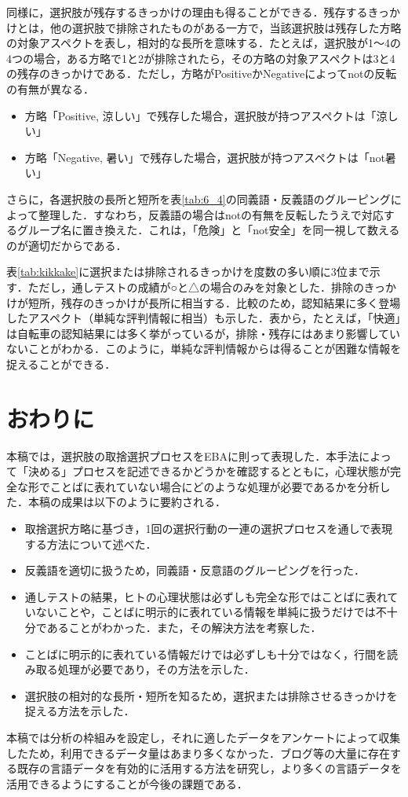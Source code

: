 \documentclass[japanese]{jnlp_1.3a}
\begin{document}
同様に，選択肢が残存するきっかけの理由も得ることができる．残存するきっかけとは，他の選択肢で排除されたものがある一方で，当該選択肢は残存した方略の対象アスペクトを表し，相対的な長所を意味する．たとえば，選択肢が1〜4の4つの場合，ある方略で1と2が排除されたら，その方略の対象アスペクトは3と4の残存のきっかけである．ただし，方略がPositiveかNegativeによってnotの反転の有無が異なる．
\begin{itemize}
\item 方略「Positive, 涼しい」で残存した場合，選択肢が持つアスペクトは「涼しい」
\item 方略「Negative, 暑い」で残存した場合，選択肢が持つアスペクトは「not暑い」
\end{itemize}

さらに，各選択肢の長所と短所を表\ref{tab:6_4}の同義語・反義語のグルーピングによって整理した．すなわち，反義語の場合はnotの有無を反転したうえで対応するグループ名に置き換えた．これは，「危険」と「not安全」を同一視して数えるのが適切だからである．

表\ref{tab:kikkake}に選択または排除されるきっかけを度数の多い順に3位まで示す．ただし，通しテストの成績が○と△の場合のみを対象とした．排除のきっかけが短所，残存のきっかけが長所に相当する．比較のため，認知結果に多く登場したアスペクト（単純な評判情報に相当）も示した．表から，たとえば，「快適」は自転車の認知結果には多く挙がっているが，排除・残存にはあまり影響していないことがわかる．このように，単純な評判情報からは得ることが困難な情報を捉えることができる．

\section{おわりに}
\label{sec:owarini}

本稿では，選択肢の取捨選択プロセスをEBAに則って表現した．本手法によって「決める」プロセスを記述できるかどうかを確認するとともに，心理状態が完全な形でことばに表れていない場合にどのような処理が必要であるかを分析した．本稿の成果は以下のように要約される．
\begin{itemize}
\item 取捨選択方略に基づき，1回の選択行動の一連の選択プロセスを通しで表現する方法について述べた．
\item 反義語を適切に扱うため，同義語・反意語のグルーピングを行った．
\item 通しテストの結果，ヒトの心理状態は必ずしも完全な形ではことばに表れていないことや，ことばに明示的に表れている情報を単純に扱うだけでは不十分であることがわかった．また，その解決方法を考察した．
\item ことばに明示的に表れている情報だけでは必ずしも十分ではなく，行間を読み取る処理が必要であり，その方法を示した．
\item 選択肢の相対的な長所・短所を知るため，選択または排除させるきっかけを捉える方法を示した．
\end{itemize}
本稿では分析の枠組みを設定し，それに適したデータをアンケートによって収集したため，利用できるデータ量はあまり多くなかった．ブログ等の大量に存在する既存の言語データを有効的に活用する方法を研究し，より多くの言語データを活用できるようにすることが今後の課題である．
\end{document}
